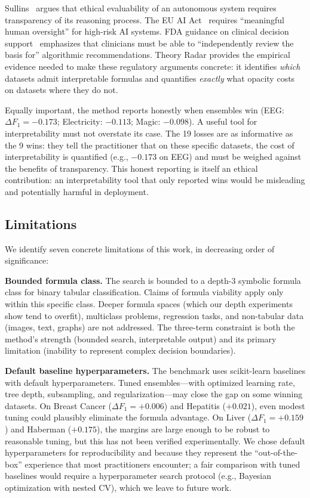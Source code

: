 \documentclass[journal]{IEEEtran}
\begin{document}
Sullins~\cite{sullins2006moral} argues that ethical evaluability of
an autonomous system requires transparency of its reasoning process.
The EU AI Act~\cite{euaiact2024} requires ``meaningful human
oversight'' for high-risk AI systems.  FDA guidance on clinical
decision support~\cite{fda2022clinical} emphasizes that clinicians
must be able to ``independently review the basis for'' algorithmic
recommendations.  Theory Radar provides the empirical evidence needed
to make these regulatory arguments concrete: it identifies
\emph{which} datasets admit interpretable formulas and quantifies
\emph{exactly} what opacity costs on datasets where they do not.

Equally important, the method reports honestly when ensembles win
(EEG: $\Delta F_1 = -0.173$; Electricity: $-0.113$; Magic:
$-0.098$).  A useful tool for interpretability must not overstate
its case.  The 19 losses are as informative as the 9 wins: they
tell the practitioner that on these specific datasets, the cost of
interpretability is quantified (e.g., $-0.173$ on EEG) and must be
weighed against the benefits of transparency.  This honest reporting
is itself an ethical contribution: an interpretability tool that
only reported wins would be misleading and potentially harmful in
deployment.

\subsection{Limitations}
\label{sec:limitations}

We identify seven concrete limitations of this work, in decreasing
order of significance:

\textbf{Bounded formula class.}
The search is bounded to a depth-3 symbolic formula class for binary
tabular classification.  Claims of formula viability apply only
within this specific class.  Deeper formula spaces (which our depth
experiments show tend to overfit), multiclass problems, regression
tasks, and non-tabular data (images, text, graphs) are not
addressed.  The three-term constraint is both the method's strength
(bounded search, interpretable output) and its primary limitation
(inability to represent complex decision boundaries).

\textbf{Default baseline hyperparameters.}
The benchmark uses scikit-learn baselines with default
hyperparameters.  Tuned ensembles---with optimized learning rate,
tree depth, subsampling, and regularization---may close the gap on
some winning datasets.  On Breast Cancer ($\Delta F_1 = +0.006$)
and Hepatitis ($+0.021$), even modest tuning could plausibly
eliminate the formula advantage.  On Liver ($\Delta F_1 = +0.159$)
and Haberman ($+0.175$), the margins are large enough to be robust
to reasonable tuning, but this has not been verified experimentally.
We chose default hyperparameters for reproducibility and because
they represent the ``out-of-the-box'' experience that most
practitioners encounter; a fair comparison with tuned baselines
would require a hyperparameter search protocol (e.g., Bayesian
optimization with nested CV), which we leave to future work.
\end{document}
